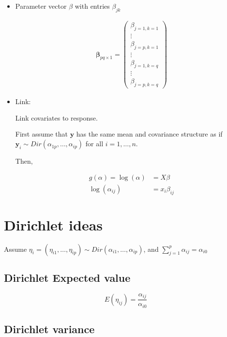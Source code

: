 \documentclass[10pt]{article}
\theoremstyle{definition}
\begin{document}
\begin{itemize}
   \item Parameter vector $\beta$ with entries $\beta_{jk}$

   \begin{align*}
     \boldsymbol\beta_{pq \times 1} = \begin{pmatrix}
     \beta_{j = 1, k = 1}\\ \vdots \\
     \beta_{j = p, k = 1} \\ \vdots \\
     \beta_{j = 1, k = q} \\ \vdots \\
     \beta_{j = p, k = q}
   \end{pmatrix}
   \end{align*}


   \item Link:

   Link covariates to response.

   First assume that $\textbf{y}$ has the same mean and covariance structure as if $\textbf{y}_i \sim Dir(\alpha_{1p}, \ldots , \alpha_{ip})$ for all $i = 1, \ldots, n$.

   Then,

   \begin{align*}
     g(\alpha) = \log(\alpha) &= X \beta \\
     \log(\alpha_{ij}) &= x_{i} \beta_{ij}
   \end{align*}




\end{itemize}





\section{Dirichlet ideas }

Assume $\eta_i = (\eta_{i1}, \ldots , \eta_{ip}) \sim Dir(\alpha_{i1}, \ldots , \alpha_{ip})$, and $\sum_{j=1}^p \alpha_{ij} = \alpha_{i0}$

\subsection{Dirichlet Expected value}

\[E(\eta_{ij}) = \frac{\alpha_{ij}}{\alpha_{i0}} \]


\subsection{Dirichlet variance }
\end{document}
